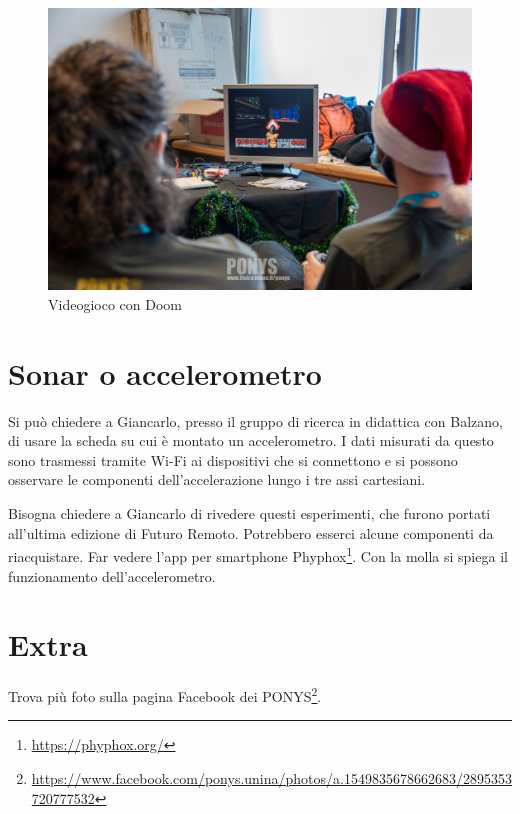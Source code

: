 \documentclass[a4paper]{article}
\begin{document}
\begin{figure}[ht]
  \centering
  \includegraphics[width=\linewidth]{figures/doom}
  \caption{\label{fig:doom} Videogioco con Doom}
\end{figure}

\section{Sonar o accelerometro}%
\label{sec:sonar-accelerometro}

Si può chiedere a Giancarlo, presso il gruppo di ricerca in didattica con
Balzano, di usare la scheda su cui è montato un accelerometro. I dati misurati
da questo sono trasmessi tramite Wi-Fi ai dispositivi che si connettono e si
possono osservare le componenti dell'accelerazione lungo i tre assi cartesiani.

Bisogna chiedere a Giancarlo di rivedere questi esperimenti, che furono portati
all'ultima edizione di Futuro Remoto. Potrebbero esserci alcune componenti da
riacquistare. Far vedere l'app per smartphone Phyphox\footnote{
  \url{https://phyphox.org/} }. Con la molla si spiega il funzionamento
dell'accelerometro.

\section{Extra}%
\label{sec:extra}

Trova più foto sulla pagina Facebook dei PONYS\footnote{
  \url{https://www.facebook.com/ponys.unina/photos/a.1549835678662683/2895353720777532}
}.
\end{document}
